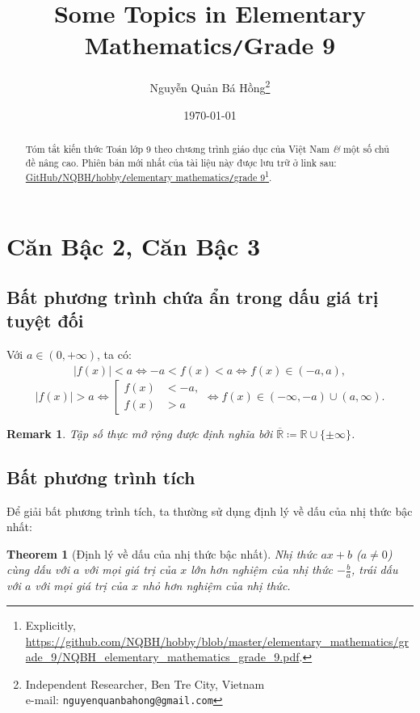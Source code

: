 \documentclass{article}
\title{Some Topics in Elementary Mathematics\texttt{/}Grade 9}
\author{Nguyễn Quản Bá Hồng\footnote{Independent Researcher, Ben Tre City, Vietnam\\e-mail: \texttt{nguyenquanbahong@gmail.com}}}
\date{\today}
\numberwithin{equation}{section}
\newtheorem{remark}{Remark}[section]
\newtheorem{theorem}{Theorem}[section]
\begin{document}
\maketitle
\begin{abstract}
	Tóm tắt kiến thức Toán lớp 9 theo chương trình giáo dục của Việt Nam \textit{\&} một số chủ đề nâng cao. Phiên bản mới nhất của tài liệu này được lưu trữ ở link sau: \href{https://github.com/NQBH/hobby/blob/master/elementary_mathematics/grade_9/NQBH_elementary_mathematics_grade_9.pdf}{GitHub\texttt{/}NQBH\texttt{/}hobby\texttt{/}elementary mathematics\texttt{/}grade 9}\footnote{Explicitly, \url{https://github.com/NQBH/hobby/blob/master/elementary_mathematics/grade_9/NQBH_elementary_mathematics_grade_9.pdf}.}.
\end{abstract}
\setcounter{secnumdepth}{4}
\setcounter{tocdepth}{3}
\tableofcontents

\section{Căn Bậc 2, Căn Bậc 3}

\subsection*{Bất phương trình chứa ẩn trong dấu giá trị tuyệt đối}
Với $a\in(0,+\infty)$, ta có:
\begin{align*}
	|f(x)| < a\Leftrightarrow -a < f(x) < a\Leftrightarrow f(x)\in(-a,a),
\end{align*}
\begin{equation*}
	|f(x)| > a\Leftrightarrow\left[\begin{split}
		f(x) &< -a,\\
		f(x) &> a
	\end{split}\right.\Leftrightarrow f(x)\in(-\infty,-a)\cup(a,\infty).
\end{equation*}

\begin{remark}
	Tập số thực mở rộng được định nghĩa bởi  $\overline{\mathbb{R}}\coloneqq\mathbb{R}\cup\{\pm\infty\}$.
\end{remark}

\subsection*{Bất phương trình tích}
Để giải bất phương trình tích, ta thường sử dụng định lý về dấu của nhị thức bậc nhất:

\begin{theorem}[Định lý về dấu của nhị thức bậc nhất]
	Nhị thức $ax + b$ ($a\ne 0$) cùng dấu với $a$ với mọi giá trị của $x$ lớn hơn nghiệm của nhị thức $-\frac{b}{a}$, trái dấu với $a$ với mọi giá trị của $x$ nhỏ hơn nghiệm của nhị thức.
\end{theorem}
\end{document}

